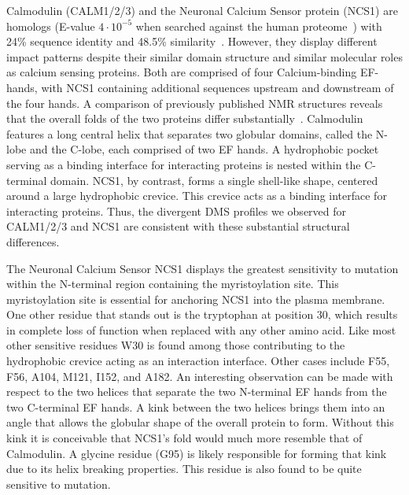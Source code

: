Calmodulin (CALM1/2/3) and the Neuronal Calcium Sensor protein (NCS1) are homologs (E-value $4 \cdot 10^{-5}$ when searched against the human proteome~\cite{altschul_basic_1990,the_uniprot_consortium_uniprot:_2015}) with 24\% sequence identity and 48.5\% similarity~\cite{rice_emboss:_2000}. However, they display different impact patterns despite their similar domain structure and similar molecular roles as calcium sensing proteins. Both are comprised of four Calcium-binding EF-hands, with NCS1 containing additional sequences upstream and downstream of the four hands. A comparison of previously published NMR structures reveals that the overall folds of the two proteins differ substantially~\cite{sarhan_crystallographic_2012,heidarsson_c-terminal_2012}. Calmodulin features a long central helix that separates two globular domains, called the N-lobe and the C-lobe, each comprised of two EF hands. A hydrophobic pocket serving as a binding interface for interacting proteins is nested within the C-terminal domain. NCS1, by contrast, forms a single shell-like shape, centered around a large hydrophobic crevice. This crevice acts as a binding interface for interacting proteins. Thus, the divergent DMS profiles we observed for CALM1/2/3 and NCS1 are consistent with these substantial structural differences.

The Neuronal Calcium Sensor NCS1 displays the greatest sensitivity to mutation within the N-terminal region containing the myristoylation site.  This myristoylation site is essential for anchoring NCS1 into the plasma membrane. One other residue that stands out is the tryptophan at position 30, which results in complete loss of function when replaced with any other amino acid. Like most other sensitive residues W30 is found among those contributing to the hydrophobic crevice acting as an interaction interface. Other cases include F55, F56, A104, M121, I152, and A182. An interesting observation can be made with respect to the two helices that separate the two N-terminal EF hands from the two C-terminal EF hands. A kink between the two helices brings them into an angle that allows the globular shape of the overall protein to form. Without this kink it is conceivable that NCS1's fold would much more resemble that of Calmodulin. A glycine residue (G95) is likely responsible for forming that kink due to its helix breaking properties. This residue is also found to be quite sensitive to mutation.

